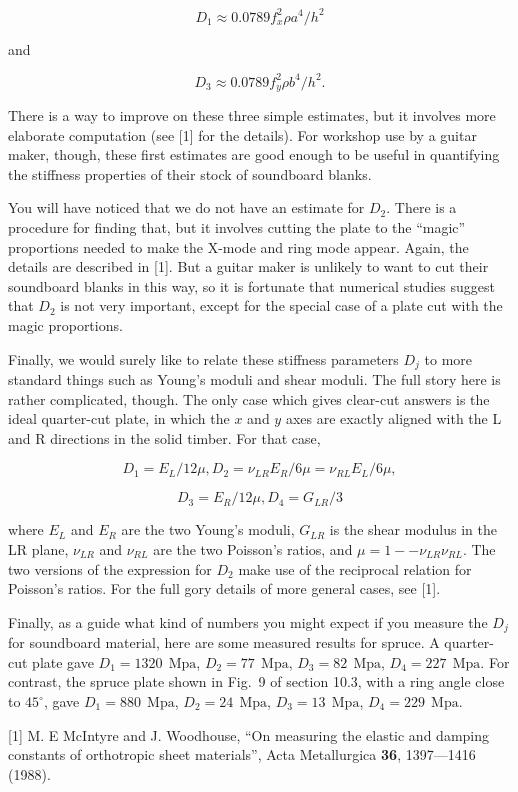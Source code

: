   \begin{equation*}D_1 \approx 0.0789 f_x^2 \rho a^4/h^2 \tag{4}\end{equation*} 

  \noindent{}and 

  \begin{equation*}D_3 \approx 0.0789 f_y^2 \rho b^4/h^2 . 
  \tag{5}\end{equation*} 

  There is a way to improve on these three simple estimates, but it involves 
  more elaborate computation (see [1] for the details). For workshop use by a 
  guitar maker, though, these first estimates are good enough to be useful in 
  quantifying the stiffness properties of their stock of soundboard blanks. 

  You will have noticed that we do not have an estimate for $D_2$. There is a 
  procedure for finding that, but it involves cutting the plate to the 
  ``magic'' proportions needed to make the X-mode and ring mode appear. Again, 
  the details are described in [1]. But a guitar maker is unlikely to want to 
  cut their soundboard blanks in this way, so it is fortunate that numerical 
  studies suggest that $D_2$ is not very important, except for the special case 
  of a plate cut with the magic proportions. 

  Finally, we would surely like to relate these stiffness parameters $D_j$ to 
  more standard things such as Young's moduli and shear moduli. The full story 
  here is rather complicated, though. The only case which gives clear-cut 
  answers is the ideal quarter-cut plate, in which the $x$ and $y$ axes are 
  exactly aligned with the L and R directions in the solid timber. For that 
  case, 

  \begin{equation*}D_1 = E_L/12 \mu, D_2 = \nu_{LR}E_R/6 \mu = \nu_{RL}E_L/6 
  \mu, \end{equation*} 

  \begin{equation*}D_3 = E_R/12 \mu, D_4 = G_{LR}/3 \tag{6}\end{equation*} 

  \noindent{}where $E_L$ and $E_R$ are the two Young's moduli, $G_{LR}$ is the 
  shear modulus in the LR plane, $\nu_{LR}$ and $\nu_{RL}$ are the two 
  Poisson's ratios, and $\mu=1 -- \nu_{LR} \nu_{RL} .$ The two versions of the 
  expression for $D_2$ make use of the reciprocal relation for Poisson's 
  ratios. For the full gory details of more general cases, see [1]. 

  Finally, as a guide what kind of numbers you might expect if you measure the 
  $D_j$ for soundboard material, here are some measured results for spruce. A 
  quarter-cut plate gave $D_1=1320~\mathrm{~Mpa}$, $D_2=77~\mathrm{~Mpa}$, 
  $D_3=82~\mathrm{~Mpa}$, $D_4=227~\mathrm{~Mpa}$. For contrast, the spruce 
  plate shown in Fig.\ 9 of section 10.3, with a ring angle close to 
  $45^\circ$, gave $D_1=880~\mathrm{~Mpa}$, $D_2=24~\mathrm{~Mpa}$, 
  $D_3=13~\mathrm{~Mpa}$, $D_4=229~\mathrm{~Mpa}$. 

  \sectionreferences{}[1] M. E McIntyre and J. Woodhouse, “On measuring the 
  elastic and damping constants of orthotropic sheet materials”, Acta 
  Metallurgica \textbf{36}, 1397—1416 (1988). 